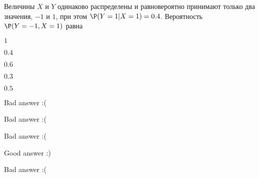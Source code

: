 
\begin{question}
Величины \(X\) и \(Y\) одинаково распределены и равновероятно принимают
только два значения, \(-1\) и \(1\), при этом \(\P(Y=1|X=1)=0.4\).
Вероятность \(\P(Y=-1,X=1)\) равна
\begin{answerlist}
  \item \(1\)
  \item \(0.4\)
  \item \(0.6\)
  \item \(0.3\)
  \item \(0.5\)
\end{answerlist}
\end{question}

\begin{solution}
\begin{answerlist}
  \item Bad answer :(
  \item Bad answer :(
  \item Bad answer :(
  \item Good answer :)
  \item Bad answer :(
\end{answerlist}
\end{solution}

